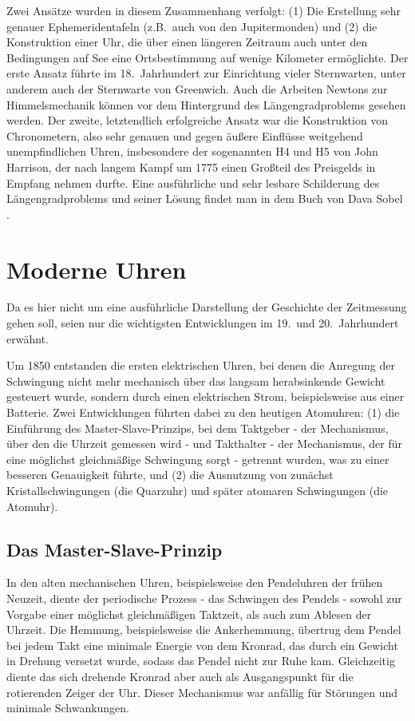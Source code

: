 Zwei Ans\"atze wurden in diesem Zusammenhang verfolgt: (1) Die Erstellung sehr genauer Ephemeridentafeln 
(z.B.\ auch von den Jupitermonden) und (2) die Konstruktion einer Uhr, die \"uber einen l\"angeren Zeitraum
auch unter den Bedingungen auf See eine Ortsbestimmung auf wenige Kilometer erm\"oglichte. Der erste
Ansatz f\"uhrte im 18.\ Jahrhundert zur Einrichtung vieler Sternwarten, unter anderem auch der
Sternwarte von Greenwich. Auch die Arbeiten Newtons zur Himmelsmechanik k\"onnen vor dem 
Hintergrund des L\"angengradproblems gesehen werden. Der zweite, letztendlich erfolgreiche Ansatz
war die Konstruktion von Chronometern, 
also sehr genauen und gegen \"au\ss ere Einfl\"usse weitgehend
unempfindlichen Uhren, insbesondere der sogenannten 
H4 und H5 von John Harrison, der nach langem Kampf
um 1775 einen Gro\ss teil des Preisgelds in Empfang nehmen durfte. Eine ausf\"uhrliche und sehr lesbare
Schilderung des L\"angengradproblems und seiner L\"osung findet man in dem Buch von Dava Sobel \cite{Sobel}.

\section{Moderne Uhren}

Da es hier nicht um eine ausf\"uhrliche Darstellung der Geschichte der Zeitmessung gehen soll, seien
nur die wichtigsten Entwicklungen im 19.\ und 20.\ Jahrhundert erw\"ahnt. 

Um 1850 entstanden die
ersten elektrischen Uhren, bei denen die Anregung der Schwingung nicht mehr mechanisch \"uber
das langsam herabsinkende Gewicht gesteuert wurde, sondern durch einen elektrischen Strom, beispielsweise
aus einer Batterie. Zwei Entwicklungen f\"uhrten dabei zu den heutigen Atomuhren: (1) die Einf\"uhrung des
\glqq Master-Slave-Prinzips\grqq, 
bei dem Taktgeber - der Mechanismus, \"uber den die Uhrzeit gemessen 
wird - und Takthalter - der Mechanismus, der f\"ur eine m\"oglichst gleichm\"a\ss ige Schwingung sorgt - 
getrennt wurden, was zu einer
besseren Genauigkeit f\"uhrte, und (2) die Ausnutzung von zun\"achst Kristallschwingungen (die Quarzuhr)
und sp\"ater atomaren Schwingungen (die Atomuhr).  

\subsection{Das Master-Slave-Prinzip}

In den alten mechanischen Uhren, beispielsweise den Pendeluhren der fr\"uhen Neuzeit, diente
der periodische Prozess - das Schwingen des Pendels - sowohl zur Vorgabe einer m\"oglichst gleichm\"a\ss igen
Taktzeit, als auch zum Ablesen der Uhrzeit. Die Hemmung, beispielsweise die Ankerhemmung, \"ubertrug
dem Pendel bei jedem Takt eine minimale Energie von dem Kronrad, das durch ein Gewicht in Drehung
versetzt wurde, sodass das Pendel nicht zur Ruhe kam. Gleichzeitig diente das sich drehende Kronrad aber auch 
als Ausgangspunkt f\"ur die rotierenden Zeiger der Uhr. Dieser Mechanismus war anf\"allig f\"ur St\"orungen
und minimale Schwankungen.

